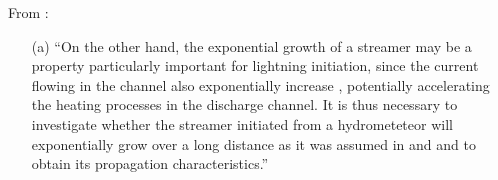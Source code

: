 \documentclass[]{article}
\begin{document}
\noindent	From \textbf{\cite{Shi:2016a}}:
	
	\begin{itemize}
		\item [(a)] ``On the other hand, the exponential growth of a streamer may be a property particularly important for lightning initiation, since the current flowing in the channel also exponentially increase \cite{Liu:2010a}, potentially accelerating the heating processes in the discharge channel. It is thus necessary to investigate whether the streamer initiated from a hydrometeteor will exponentially grow over a long distance as it was assumed in \citet{Liu:2012c} and \citet{Sadighi:2015a} and to obtain its propagation characteristics.''
	\end{itemize}




\end{document}

